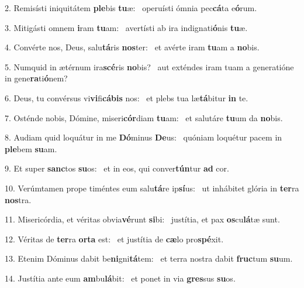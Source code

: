 2. Remisísti iniquitátem \textbf{ple}bis \textbf{tu}æ: \ast\  operuísti ómnia pec\textbf{cá}ta e\textbf{ó}rum.\

3. Mitigásti omnem \textbf{i}ram \textbf{tu}am: \ast\  avertísti ab ira indignati\textbf{ó}nis \textbf{tu}æ.\

4. Convérte nos, Deus, salu\textbf{tá}ris \textbf{nos}ter: \ast\  et avérte iram \textbf{tu}am a \textbf{no}bis.\

5. Numquid in ætérnum ira\textbf{scé}ris \textbf{no}bis? \ast\  aut exténdes iram tuam a generatióne in gene\textbf{ra}ti\textbf{ó}nem?\

6. Deus, tu convérsus vi\textbf{vi}fi\textbf{cá}\textbf{bis} nos: \ast\  et plebs tua læ\textbf{tá}bitur \textbf{in} te.\

7. Osténde nobis, Dómine, miseri\textbf{cór}diam \textbf{tu}am: \ast\  et salutáre \textbf{tu}um da \textbf{no}bis.\

8. Audiam quid loquátur in me \textbf{Dó}minus \textbf{De}us: \ast\  quóniam loquétur pacem in \textbf{ple}bem \textbf{su}am.\

9. Et super \textbf{sanc}tos \textbf{su}os: \ast\  et in eos, qui conver\textbf{tún}tur \textbf{ad} cor.\

10. Verúmtamen prope timéntes eum salu\textbf{tá}re ip\textbf{sí}us: \ast\  ut inhábitet glória in \textbf{ter}ra \textbf{nos}tra.\

11. Misericórdia, et véritas obvia\textbf{vé}runt \textbf{si}bi: \ast\  justítia, et pax \textbf{os}cu\textbf{lá}tæ sunt.\

12. Véritas de \textbf{ter}ra \textbf{or}\textbf{ta} est: \ast\  et justítia de \textbf{cæ}lo pro\textbf{spé}xit.\

13. Etenim Dóminus dabit be\textbf{ni}gni\textbf{tá}tem: \ast\  et terra nostra dabit \textbf{fruc}tum \textbf{su}um.\

14. Justítia ante eum \textbf{am}bu\textbf{lá}bit: \ast\  et ponet in via \textbf{gres}sus \textbf{su}os.\

